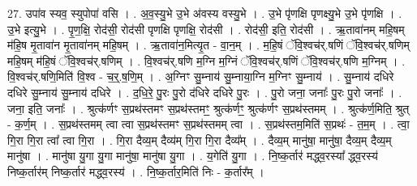 \documentclass[17pt]{extarticle}
\begin{document}
27. उपा॑व स्यव॒ स्युपोपा॑ वसि । . अ॒व॒स्यु॒भे उ॒भे अ॑वस्य वस्यु॒भे । . उ॒भे पृ॑णक्षि पृणक्ष्यु॒भे उ॒भे पृ॑णक्षि । . उ॒भे इत्यु॒भे । . पृ॒ण॒क्षि॒ रोद॑सी॒ रोद॑सी पृणक्षि पृणक्षि॒ रोद॑सी । . रोद॑सी॒ इति॒ रोद॑सी । . ऋ॒तावा॑नम् महि॒षम् म॑हि॒ष मृ॒तावा॑न मृ॒तावा॑नम् महि॒षम् । . ऋ॒तावा॑न॒मित्यृ॒त - वा॒न॒म् । . म॒हि॒षं ॅवि॒श्वच॑र्.षणिं ॅवि॒श्वच॑र्.षणिम् महि॒षम् म॑हि॒षं ॅवि॒श्वच॑र्.षणिम् । . वि॒श्वच॑र्.षणि म॒ग्नि म॒ग्निं ॅवि॒श्वच॑र्.षणिं ॅवि॒श्वच॑र्.षणि म॒ग्निम् । . वि॒श्वच॑र्.षणि॒मिति॑ वि॒श्व - च॒र्॒.ष॒णि॒म् । . अ॒ग्निꣳ सु॒म्नाय॑ सु॒म्नाया॒ग्नि म॒ग्निꣳ सु॒म्नाय॑ । . सु॒म्नाय॑ दधिरे दधिरे सु॒म्नाय॑ सु॒म्नाय॑ दधिरे । . द॒धि॒रे॒ पु॒रः पु॒रो द॑धिरे दधिरे पु॒रः । . पु॒रो जना॒ जनाः᳚ पु॒रः पु॒रो जनाः᳚ । . जना॒ इति॒ जनाः᳚ । . श्रुत्क॑र्णꣳ स॒प्रथ॑स्तमꣳ स॒प्रथ॑स्तमꣳ॒॒ श्रुत्क॑र्णꣳ॒॒ श्रुत्क॑र्णꣳ स॒प्रथ॑स्तमम् । . श्रुत्क॑र्ण॒मिति॒ श्रुत् - क॒र्ण॒म् । . स॒प्रथ॑स्तमम् त्वा त्वा स॒प्रथ॑स्तमꣳ स॒प्रथ॑स्तमम् त्वा । . स॒प्रथ॑स्तम॒मिति॑ स॒प्रथः॑ - त॒म॒म् । . त्वा॒ गि॒रा गि॒रा त्वा᳚ त्वा गि॒रा । . गि॒रा दैव्य॒म् दैव्य॑म् गि॒रा गि॒रा दैव्य᳚म् । . दैव्य॒म् मानु॑षा॒ मानु॑षा॒ दैव्य॒म् दैव्य॒म् मानु॑षा । . मानु॑षा यु॒गा यु॒गा मानु॑षा॒ मानु॑षा यु॒गा । . य॒गेति॑ यु॒गा । . नि॒ष्क॒र्तार॑ मद्ध्व॒रस्या᳚ द्ध्व॒रस्य॑ निष्क॒र्तार॑म् निष्क॒र्तार॑ मद्ध्व॒रस्य॑ । . नि॒ष्क॒र्तार॒मिति॑ निः - क॒र्तार᳚म् । \newline
\end{document}
